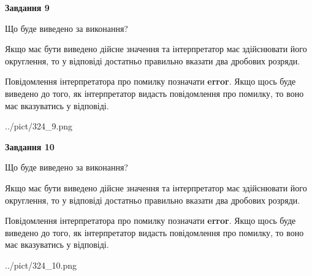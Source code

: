 \documentclass[12pt, ukrainian]{article}
\begin{document}
{\begin {Large}
{\begin {center}\textbf{Завдання 9}\end {center}}\par
Що буде виведено за виконання? \par

Якщо має бути виведено дійсне значення та інтерпретатор має здійснювати його округлення, 
то у відповіді достатньо правильно вказати два дробових розряди.

Повідомлення інтерпретатора про помилку позначати \textbf{error}.
Якщо щось буде виведено до того, як інтерпретатор видасть повідомлення про помилку, 
то воно має вказуватись у відповіді. \par

\begin{center}
	{../pict/324_9.png}
\end{center}
\newpage

{\begin {center}\textbf{Завдання 10}\end {center}}\par
Що буде виведено за виконання? \par

Якщо має бути виведено дійсне значення та інтерпретатор має здійснювати його округлення, 
то у відповіді достатньо правильно вказати два дробових розряди.

Повідомлення інтерпретатора про помилку позначати \textbf{error}.
Якщо щось буде виведено до того, як інтерпретатор видасть повідомлення про помилку, 
то воно має вказуватись у відповіді. \par

\begin{center}
	{../pict/324_10.png}
\end{center}
\newpage

\end {Large}}
\end{document}
